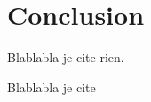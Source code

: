 \documentclass[11pt, twoside, a4paper, openright]{report}
\begin{document}


\chapter{Conclusion}

Blablabla je cite rien.

Blablabla je cite \cite{Chabanier2018}


\printbibliography
\end{document}
